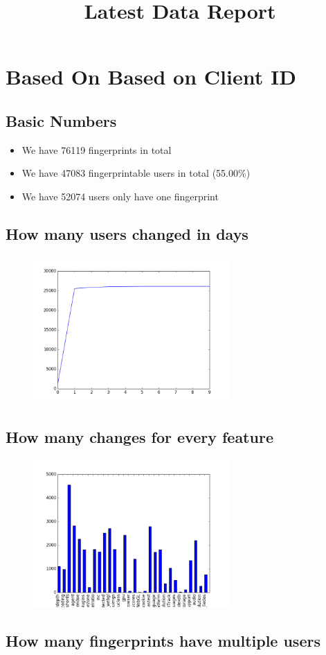 \documentclass[10pt, conference, compsocconf]{IEEEtran}
\begin{document}
\title{Latest Data Report}
\author{
}
\maketitle
\section{Based On Based on Client ID}
\subsection{Basic Numbers}
\begin{itemize}\item We have 76119 fingerprints in total\item We have 47083 fingerprintable users in total (55.00\%)\item We have 52074 users only have one fingerprint \end{itemize}\subsection{How many users changed in days}
\begin{figure}[H]\centering\includegraphics[width=75mm,scale=0.5]{BasedonClientIDchangebytime}\end{figure}\subsection{How many changes for every feature}
\begin{figure}[H]\centering\includegraphics[width=75mm,scale=0.5]{BasedonClientIDfeaturechange}\end{figure}\subsection{How many fingerprints have multiple users}
\end{document}
